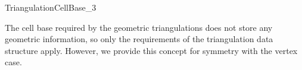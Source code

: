 

\begin{ccRefConcept}{TriangulationCellBase_3}

\ccDefinition

The cell base required by the geometric triangulations does not store any
geometric information, so only the requirements of the triangulation data
structure apply.  However, we provide this concept for symmetry with the
vertex case.

\ccRefines {}

\ccHasModels

\\

\ccSeeAlso




\end{ccRefConcept}
